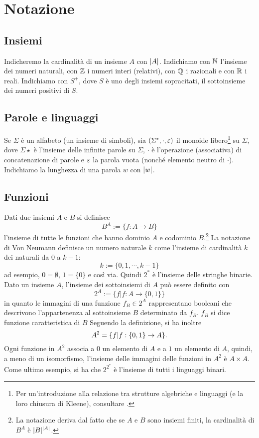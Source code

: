 \section*{Notazione}


\subsection*{Insiemi}
Indicheremo la cardinalità di un insieme $A$ con $| A |$.
Indichiamo con $\mathbb N$ l'insieme dei numeri naturali, con $\mathbb Z$ i numeri interi (relativi), con $\mathbb Q$ i razionali e con $\mathbb R$ i reali.
Indichiamo con $S^+$, dove $S$ è uno degli insiemi sopracitati, il sottoinsieme dei numeri positivi di $S$.


\subsection*{Parole e linguaggi}
Se $\Sigma$ è un alfabeto (un insieme di simboli), sia $(\Sigma^*, \cdot, \varepsilon)$ il monoide libero\footnote{Per un'introduzione alla relazione tra strutture algebriche e linguaggi (e la loro	chiusura di Kleene), consultare \cite{Sakarovitch:09:automata}.} su $\Sigma$, dove $\Sigma\star$ è l'insieme delle infinite parole su $\Sigma$, $\cdot$ è l'operazione (associativa) di concatenazione di parole e $\varepsilon$ la parola vuota (nonché elemento neutro di $\cdot$).
Indichiamo la lunghezza di una parola $w$ con $|w|$.


\subsection*{Funzioni}
Dati due insiemi $A$ e $B$ si definisce
\begin{equation*}
	B^A := \{f : A \to B\}
\end{equation*}
l'insieme di tutte le funzioni che hanno dominio $A$ e codominio $B$.\footnote{La notazione deriva dal fatto che se $A$ e $B$ sono insiemi finiti, la cardinalità di $B^A$ è $| B |^{| A |}$.}
La notazione di Von Neumann definisce un numero naturale $k$ come l'insieme di cardinalità $k$ dei naturali da $0$ a $k-1$:
$$
	k := \{0,1,\cdots,k-1\}
$$
ad esempio, $0 = \emptyset$, $1 = \{0\}$ e così via. Quindi $2^*$ è l'insieme delle stringhe binarie.
Dato un insieme $A$, l'insieme dei sottoinsiemi di $A$ può essere definito con
$$
	2^A := \{f | f: A \to \{0,1\}\}
$$
in quanto le immagini di una funzione $f_B\in2^A$ rappresentano booleani che descrivono l'appartenenza al sottoinsieme $B$ determinato da $f_B$. $f_B$ si dice funzione caratteristica di $B$
Seguendo la definizione, si ha inoltre
$$
	A^2 = \{f| f: \{0,1\} \to A\}\text.
$$
Ogni funzione in $A^2$ associa a $0$ un elemento di $A$ e a $1$ un elemento di $A$, quindi, a meno di un isomorfismo, l'insieme delle immagini delle funzioni in $A^2$ è $A \times A$.
Come ultimo esempio, si ha che $2^{2^*}$ è l'insieme di tutti i linguaggi binari.


